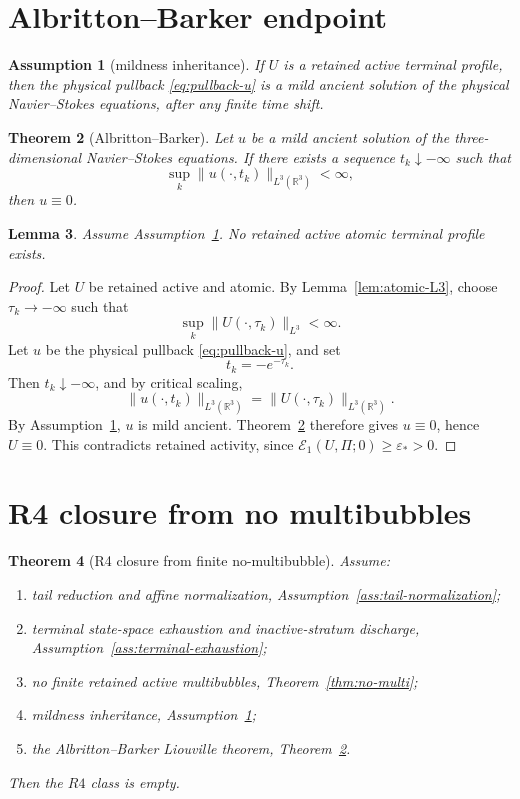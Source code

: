\documentclass[11pt]{article}
\numberwithin{equation}{section}
\newtheorem{theorem}{Theorem}[section]
\newtheorem{lemma}[theorem]{Lemma}
\newtheorem{assumption}[theorem]{Assumption}
\newcommand{\R}{\mathbb R}
\newcommand{\eps}{\varepsilon}
\newcommand{\cE}{\mathcal E}
\begin{document}
\section{Albritton--Barker endpoint}

\begin{assumption}[mildness inheritance]
\label{ass:mildness}
If \(U\) is a retained active terminal profile, then the physical pullback
\eqref{eq:pullback-u} is a mild ancient solution of the physical
Navier--Stokes equations, after any finite time shift.
\end{assumption}

\begin{theorem}[Albritton--Barker]
\label{thm:AB}
Let \(u\) be a mild ancient solution of the three-dimensional Navier--Stokes
equations.  If there exists a sequence \(t_k\downarrow-\infty\) such that
\[
  \sup_k\|u(\cdot,t_k)\|_{L^3(\R^3)}<\infty,
\]
then \(u\equiv0\).
\end{theorem}

\begin{lemma}
\label{lem:atomic-vanish}
Assume Assumption~\ref{ass:mildness}.  No retained active atomic terminal
profile exists.
\end{lemma}

\begin{proof}
Let \(U\) be retained active and atomic.  By Lemma~\ref{lem:atomic-L3}, choose
\(\tau_k\to-\infty\) such that
\[
  \sup_k\|U(\cdot,\tau_k)\|_{L^3}<\infty.
\]
Let \(u\) be the physical pullback \eqref{eq:pullback-u}, and set
\[
  t_k=-e^{-\tau_k}.
\]
Then \(t_k\downarrow-\infty\), and by critical scaling,
\[
  \|u(\cdot,t_k)\|_{L^3(\R^3)}
  =
  \|U(\cdot,\tau_k)\|_{L^3(\R^3)}.
\]
By Assumption~\ref{ass:mildness}, \(u\) is mild ancient.  Theorem~\ref{thm:AB}
therefore gives \(u\equiv0\), hence \(U\equiv0\).  This contradicts retained
activity, since \(\cE_1(U,\Pi;0)\ge\eps_*>0\).
\end{proof}

\section{R4 closure from no multibubbles}

\begin{theorem}[R4 closure from finite no-multibubble]
\label{thm:R4-closure}
Assume:
\begin{enumerate}[label=(\roman*)]
  \item tail reduction and affine normalization,
  Assumption~\ref{ass:tail-normalization};
  \item terminal state-space exhaustion and inactive-stratum discharge,
  Assumption~\ref{ass:terminal-exhaustion};
  \item no finite retained active multibubbles, Theorem~\ref{thm:no-multi};
  \item mildness inheritance, Assumption~\ref{ass:mildness};
  \item the Albritton--Barker Liouville theorem, Theorem~\ref{thm:AB}.
\end{enumerate}
Then the \(R4\) class is empty.
\end{theorem}
\end{document}
